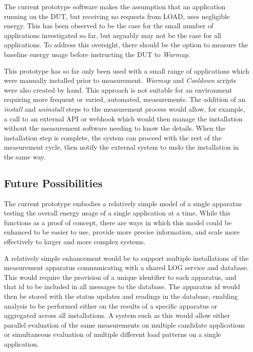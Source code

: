 The current prototype software makes the assumption that an application running on the DUT, but receiving no requests from LOAD, uses negligible energy. This has been observed to be the case for the small number of applications investigated so far, but arguably may not be the case for all applications. To address this oversight, there should be the option to measure the baseline energy usage before instructing the DUT to \emph{Warmup}.

This prototype has so far only been used with a small range of applications which were manually installed prior to measurement. \emph{Warmup} and \emph{Cooldown} scripts were also created by hand. This approach is not suitable for an environment requiring more frequent or varied, automated, measurements. The addition of an \emph{install} and \emph{uninstall} steps to the measurement process would allow, for example, a call to an external API or webhook which would then manage the installation without the measurement software needing to know the details. When the installation step is complete, the system can proceed with the rest of the measurement cycle, then notify the external system to undo the installation in the same way.

\subsection{Future Possibilities}

The current prototype embodies a relatively simple model of a single apparatus testing the overall energy usage of a single application at a time. While this functions as a proof of concept, there are ways in which this model could be enhanced to be easier to use, provide more precise information, and scale more effectively to larger and more complex systems.

A relatively simple enhancement would be to support multiple installations of the measurement apparatus communicating with a shared LOG service and database. This would require the provision of a unique identifier to each apparatus, and that id to be included in all messages to the database. The apparatus id would then be stored with the status updates and readings in the database, enabling analysis to be performed either on the results of a specific apparatus or aggregated across all installations. A system such as this would allow either parallel evaluation of the same measurements on multiple candidate applications or simultaneous evaluation of multiple different load patterns on a single application.


